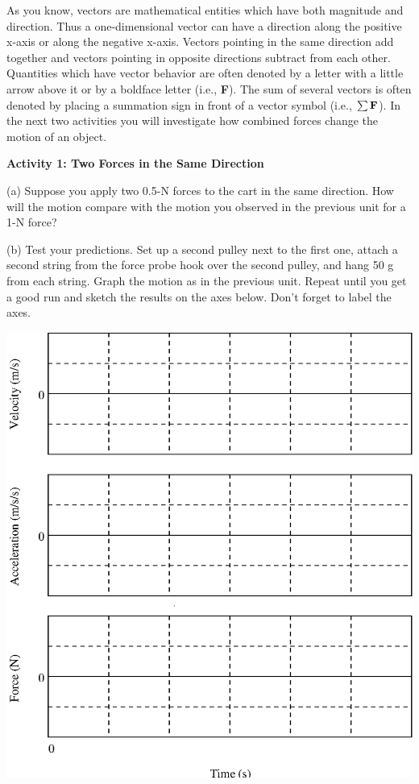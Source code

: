 As you know, vectors are mathematical entities which have both magnitude and
direction. Thus a one-dimensional vector can have a direction along the positive
x-axis or along the negative x-axis. Vectors pointing in the same direction
add together and vectors pointing in opposite directions subtract from each
other. Quantities which have vector behavior are often denoted by a letter with
a little arrow above it or by a boldface letter (i.e., \textbf{F}). The sum of
several vectors is often denoted by placing a summation sign in front of a vector
symbol (i.e., \( \sum {\bf F}  \)). In the next two activities you will
investigate how combined forces change the motion of an object.

\textbf{Activity 1: Two Forces in the Same Direction}

(a) Suppose you apply two 0.5-N forces to the cart in the same direction. How
will the motion compare with the motion you observed in the previous unit for
a 1-N force?
\vspace{10mm}

(b) Test your predictions. Set up a second pulley next to the first one, attach
a second string from the force probe hook over the second pulley, and hang 50
g from each string. Graph the motion as in the previous unit. Repeat until you
get a good run and sketch the results on the axes below. Don't forget to label
the axes.

\vspace{0.3cm}
{\par\centering \includegraphics{force2/force2_fig4.eps} \par}
\vspace{0.3cm}

